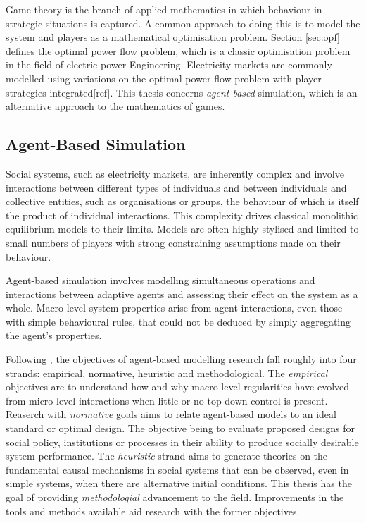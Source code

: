 Game theory is the branch of applied mathematics in which behaviour in
strategic situations is captured.  A common approach to doing this is to
model the system and players as a mathematical optimisation problem.  Section
\ref{sec:opf} defines the optimal power flow problem, which is a classic
optimisation problem in the field of electric power Engineering.  Electricity
markets are commonly modelled using variations on the optimal power flow problem with
player strategies integrated[ref].  This thesis concerns \textit{agent-based}
simulation, which is an alternative approach to the mathematics of games.

\subsection{Agent-Based Simulation}
Social systems, such as electricity markets, are inherently complex and involve
interactions between different types of individuals and between individuals
and collective entities, such as organisations or groups, the behaviour of which
is itself the product of individual interactions.  This complexity
drives classical monolithic equilibrium models to their limits.  Models are
often highly stylised and limited to small numbers of players with strong
constraining assumptions made on their behaviour.

Agent-based simulation involves modelling simultaneous operations and
interactions between adaptive agents and assessing their effect on the system
as a whole.  Macro-level system properties arise from agent interactions, even
those with simple behavioural rules, that could not be deduced by simply
aggregating the agent's properties. %

Following \cite{tesfatsi:handbook}, the objectives of agent-based modelling
research fall roughly into four strands: empirical, normative, heuristic and
methodological. The \textit{empirical} objectives are to understand how and why macro-level
regularities have evolved from micro-level interactions when little or no
top-down control is present.  Reaserch with \textit{normative} goals aims to
relate agent-based models to an ideal standard or optimal design.  The objective being
to evaluate proposed designs for social policy, institutions or processes in
their ability to produce socially desirable system performance.  The
\textit{heuristic} strand aims to generate theories on the fundamental causal
mechanisms in social systems that can be observed, even in simple systems, when there are
alternative initial conditions.  This thesis has the goal of providing
\textit{methodologial} advancement to the field.  Improvements in the tools and
methods available aid research with the former objectives.

